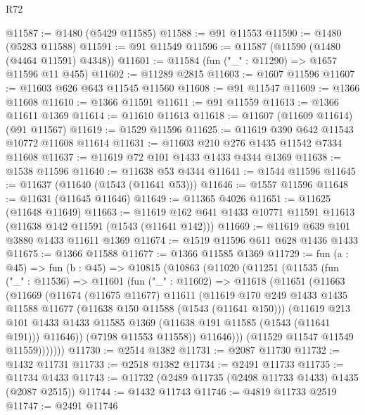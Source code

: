\begin{lexlean}{R72}
\begin{coremodule}
@11587 := @1480 (@5429 @11585)
@11588 := @91 @11553
@11590 := @1480 (@5283 @11588)
@11591 := @91 @11549
@11596 := @11587 (@11590 (@1480 (@4464 @11591) @4348))
@11601 := @11584 (fun ("_" : @11290) => @1657 @11596 @11 @455)
@11602 := @11289 @2815
@11603 := @1607 @11596
@11607 := @11603 @626 @643 @11545 @11560
@11608 := @91 @11547
@11609 := @1366 @11608
@11610 := @1366 @11591
@11611 := @91 @11559
@11613 := @1366 @11611 @1369
@11614 := @11610 @11613
@11618 := @11607 (@11609 @11614) (@91 @11567)
@11619 := @1529 @11596
@11625 := @11619 @390 @642 @11543 @10772 @11608 @11614
@11631 := @11603 @210 @276 @1435 @11542 @7334 @11608
@11637 := @11619 @72 @101 @1433 @1433 @4344 @1369
@11638 := @1538 @11596
@11640 := @11638 @53 @4344
@11641 := @1544 @11596
@11645 := @11637 (@11640 (@1543 (@11641 @53)))
@11646 := @1557 @11596
@11648 := @11631 (@11645 @11646)
@11649 := @11365 @4026
@11651 := @11625 (@11648 @11649)
@11663 := @11619 @162 @641 @1433 @10771 @11591 @11613 (@11638 @142 @11591 (@1543 (@11641 @142)))
@11669 := @11619 @639 @101 @3880 @1433 @11611 @1369
@11674 := @1519 @11596 @611 @628 @1436 @1433
@11675 := @1366 @11588
@11677 := @1366 @11585 @1369
@11729 := fun (a : @45) =>
  fun (b : @45) =>
  @10815
    (@10863
      (@11020
        (@11251
          (@11535
            (fun ("_" : @11536) =>
            @11601
              (fun ("_" : @11602) =>
              @11618
                (@11651
                  (@11663
                    (@11669
                      (@11674
                        (@11675 @11677)
                        @11611
                        (@11619
                          @170
                          @249
                          @1433
                          @1435
                          @11588
                          @11677
                          (@11638 @150 @11588 (@1543 (@11641 @150)))
                          (@11619
                            @213
                            @101
                            @1433
                            @1433
                            @11585
                            @1369
                            (@11638 @191 @11585 (@1543 (@11641 @191)))
                            @11646))
                        (@7198 @11553 @11558))
                      @11646)))
                (@11529 @11547 @11549 @11559)))))))
@11730 := @2514 @1382
@11731 := @2087 @11730
@11732 := @1432 @11731
@11733 := @2518 @1382
@11734 := @2491 @11733
@11735 := @11734 @1433
@11743 := @11732 (@2489 @11735 (@2498 @11733 @1433) @1435 (@2087 @2515))
@11744 := @1432 @11743
@11746 := @4819 @11733 @2519
@11747 := @2491 @11746

\end{coremodule}
\end{lexlean}
